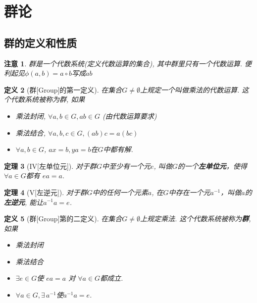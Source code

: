 \documentclass[UTF8]{ctexart}
\newtheorem{Definition}{定义}%
\newtheorem{Theorem}[Definition]{定理}
\newtheorem{Remark}[Definition]{注意}
\begin{document}
\section{群论}

\subsection{群的定义和性质}

\begin{Remark}
群是一个代数系统(定义代数运算的集合), 其中群里只有一个代数运算. 便利起见$\phi(a, b) = a \circ b$写成$a b$
\end{Remark}

\begin{Definition}[群\mbox{[Group]}的第一定义]
在集合$G \neq \emptyset$上规定一个叫做乘法的代数运算. 这个代数系统被称为群, 如果
\begin{itemize}
	\item[\uppercase\expandafter{\romannumeral1}] 乘法封闭, $\forall a, b \in G, ab \in G$ (由代数运算要求)
	\item[\uppercase\expandafter{\romannumeral2}] 乘法结合, $\forall a, b, c \in G, (ab)c = a(bc)$
	\item[\uppercase\expandafter{\romannumeral3}] $ \forall a, b \in G$, $ax = b, ya = b$在$G$中都有解.
\end{itemize}
\end{Definition}

\begin{Theorem}[IV\mbox{[左单位元]}]
对于群$G$中至少有一个元$e$, 叫做$G$的一个\textbf{左单位元}，使得$\forall a \in G$都有 $ea = a$.
\end{Theorem}


\begin{Theorem}[V\mbox{[左逆元]}]
对于群$G$中的任何一个元素$a$, 在$G$中存在一个元$a^{-1}$，叫做$a$的\textbf{左逆元}, 能让$a^{-1} a = e$.
\end{Theorem}


\begin{Definition}[群\mbox{[Group]}第的二定义]
在集合$G \neq \emptyset$上规定乘法. 这个代数系统被称为\textbf{群}, 如果
\begin{itemize}
	\item[\uppercase\expandafter{\romannumeral1}] 乘法封闭
	\item[\uppercase\expandafter{\romannumeral2}] 乘法结合
	\item[IV] $\exists e \in G$使 $ea =a$ 对 $\forall a \in G$都成立.
	\item[V]$\forall a \in G, \exists \, a^{-1}$使$a^{-1}a = e$.
\end{itemize}
\end{Definition}
\end{document}
